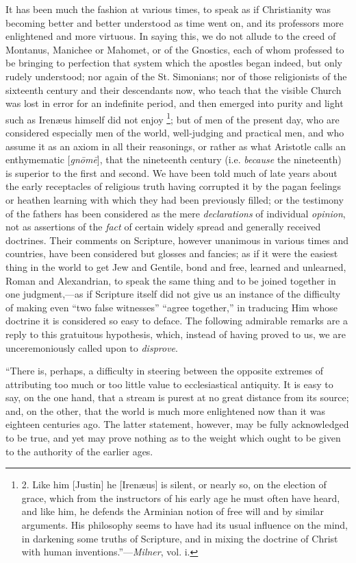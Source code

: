 It has been
much the fashion at various times, to speak as if Christianity was
becoming better and better understood as time went on, and its
professors more enlightened and more virtuous. In saying this, we do not
allude to the creed of Montanus, Manichee or Mahomet, or of the
Gnostics, each of whom professed to be bringing to perfection that
system which the apostles began indeed, but only rudely understood; nor
again of the St. Simonians; nor of those religionists of the sixteenth
century and their descendants now, who teach that the visible Church was
lost in error for an indefinite period, and then emerged into purity and
light such as Irenæus himself did not enjoy \footnote{2. Like him
[Justin] he [Irenæus] is silent, or nearly so, on the election of
grace, which from the instructors of his early age he must often have
heard, and like him, he defends the Arminian notion of free will and by
similar arguments. His philosophy seems to have had its usual influence
on the mind, in darkening some truths of Scripture, and in mixing the
doctrine of Christ with human inventions.''—\emph{Milner}, vol. i.}; but of men of the
present day, who are considered especially men of the world,
well-judging and practical men, and who assume it as an axiom in all
their reasonings, or rather as what Aristotle calls an enthymematic [\emph{gn\={o}m\={e}}],
that the nineteenth century (i.e. \emph{because} the nineteenth) is
superior to the first and second. We have been told much of late years
about the early receptacles of religious truth having corrupted it by
the pagan feelings or heathen learning with which they had been
previously filled; or the testimony of the fathers has been considered
as the mere \emph{declarations} of individual \emph{opinion}, not as
assertions of the \emph{fact} of certain widely spread and generally
received doctrines. Their comments on Scripture, however unanimous in
various times and countries, have been considered but glosses and
fancies; as if it were the easiest thing in the world to get Jew and
Gentile, bond and free, learned and unlearned, Roman and Alexandrian, to
speak the same thing and to be joined together in one judgment,—as if
Scripture itself did not give us an instance of the difficulty of making
even ``two false witnesses'' ``agree together,'' in traducing Him
whose doctrine it is considered so easy to deface. The following admirable remarks are a reply to this gratuitous hypothesis, which,
instead of having proved to us, we are unceremoniously called upon to \emph{disprove}.

``There
is, perhaps, a difficulty in steering between the opposite extremes of
attributing too much or too little value to ecclesiastical antiquity. It
is easy to say, on the one hand, that a stream is purest at no great
distance from its source; and, on the other, that the world is much more
enlightened now than it was eighteen centuries ago. The latter
statement, however, may be fully acknowledged to be true, and yet may
prove nothing as to the weight which ought to be given to the authority
of the earlier ages.

